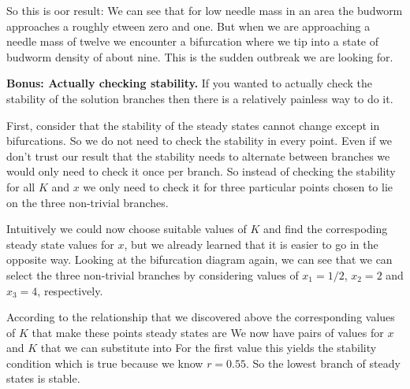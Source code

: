 So this is oor result: We can see that for low needle mass in an area the budworm approaches a roughly etween zero and one. But when we are approaching a needle mass of twelve we encounter a bifurcation where we tip into a state of budworm density of about nine. This is the sudden outbreak we are looking for.\\[0.5cm] 

\par{\bf Bonus: Actually checking stability.} If you wanted to actually check the stability of the solution branches then there is a relatively painless way to do it. 

First, consider that the stability of the steady states cannot change except in bifurcations. So we do not need to check the stability in every point. Even if we don't trust our result that the stability needs to alternate between branches we would only need to check it once per branch. So instead of checking the stability for all $K$ and $x$ we only need to check it for three particular points chosen to lie on the three non-trivial branches. 

Intuitively we could now choose suitable values of $K$ and find the correspoding steady state values for $x$, but we already learned that it is easier to go in the opposite way. Looking at the bifurcation diagram again, we can see that we can select the three non-trivial branches by considering values of $x_1=1/2$, $x_2=2$ and $x_3=4$, respectively.

According to the relationship that we discovered above the corresponding values of $K$ that make these points steady states are
We now have pairs of values for $x$ and $K$ that we can substitute into
For the first value this yields the stability condition 
which is true because we know $r=0.55$. So the lowest branch of steady states is stable.

